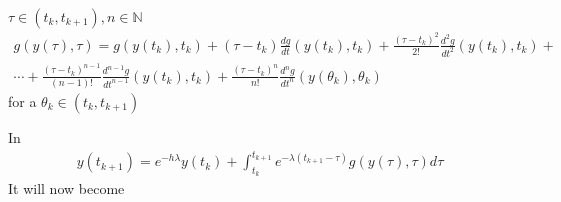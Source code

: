 \documentclass[letterpaper,10pt,english]{jupyterBook}
\begin{document}
\sphinxAtStartPar
\(\tau \in (t_k, t_{k+1}), n \in \mathbb{N}\)
\begin{equation*}
\begin{split}
    g(y(\tau), \tau) = g(y(t_k), t_k) + (\tau - t_k) \frac{dg}{dt} (y(t_k), t_k) + \frac{(\tau - t_k)^2}{2!} \frac{d^2g}{dt^2} (y(t_k), t_k) + \\
    \dotsi + \frac{(\tau - t_k)^{n-1}}{(n-1)!} \frac{d^{n-1}g}{dt^{n-1}} (y(t_k), t_k) + \frac{(\tau - t_k)^n}{n!} \frac{d^ng}{dt^n} (y(\theta_k), \theta_k)
\end{split}
\end{equation*}
\sphinxAtStartPar
for a \(\theta_k \in (t_k, t_{k+1})\)

\sphinxAtStartPar
In
\begin{equation*}
\begin{split}
    y(t_{k+1}) = e^{-h \lambda}y(t_k) + \int_{t_k}^{t_{k+1}} e^{-\lambda(t_{k+1}-\tau)} g(y(\tau), \tau) d\tau
\end{split}
\end{equation*}
\sphinxAtStartPar
It will now become
\end{document}
